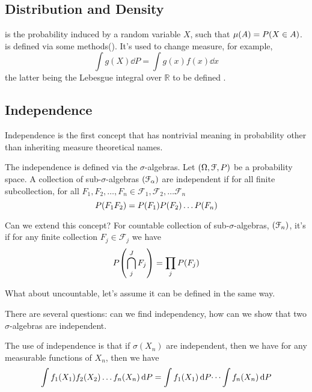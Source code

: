 \subsection{Distribution and Density}

 is the probability induced by a random variable \(X\), such that \(\mu(A) = P\pqty{X \in A}\).  is defined via some methods(). It's used to change measure, for example,
\begin{equation*}
    \int g(X) \dd{P} = \int g(x)f(x)\dd{x}
\end{equation*}
the latter being the Lebesgue integral over \(\mathbb{R}\) to be defined .



\subsection{Independence}

Independence is the first concept that has nontrivial meaning in probability other than inheriting measure theoretical names. 

The independence is defined via the \(\sigma\)-algebras. Let \(\pqty{\Omega, \mathcal{F}, P}\) be a probability space. A collection of sub-\(\sigma\)-algebras \(\pqty{\mathcal{F}_{\alpha}}\) are independent if for all finite subcollection, for all \(F_{1}, F_{2}, \dots, F_{n} \in\mathcal{F}_{1}, \mathcal{F}_{2}, \dots \mathcal{F}_{n}\)
\begin{equation*}
    P\pqty{F_{1} F_{2}} = P(F_{1}) P(F_{2}) \dots P \pqty{F_{n}}
\end{equation*}

Can we extend this concept? For countable collection of sub-\(\sigma\)-algebras, \(\pqty{\mathcal{F}_{n}}\), it's  if for any finite collection \(F_{j} \in \mathcal{F}_{j}\) we have 
\begin{equation*}
    P\pqty{\cap_{j}^{J} F_{j}} = \prod_{j} P \pqty{F_{j}}
\end{equation*}

What about uncountable, let's assume it can be defined in the same way. 

There are several questions: can we find independency, how can we show that two \(\sigma\)-algebras are independent. 

The use of independence is that if \(\sigma(X_{n})\) are independent, then we have for any measurable functions of \(X_{n}\), then we have 
\begin{equation*}
    \int f_{1}\pqty{X_{1}} f_{2}\pqty{X_{2}} \dots f_{n}\pqty{X_{n}} \dd{P} = \int f_{1}\pqty{X_{1}} \dd{P} \dots \int f_{n}\pqty{X_{n}} \dd{P}
\end{equation*}

